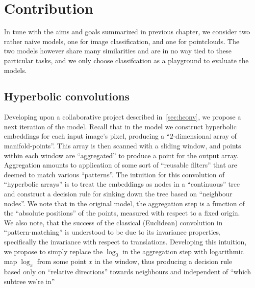 \chapter{Contribution} \label{chap:conclusion}

In tune with the aims and goals summarized in previous chapter,
we consider two rather naive models, one for image classification, and one for
pointclouds. The two models however share many similarities and are in no way
tied to these particular tasks, and we only choose classifcation as a
playground to evaluate the models.

\section{Hyperbolic convolutions} \label{sec:hconv-new}

Developing upon a collaborative project described
in~\autoref{sec:hconv}, we propose a next
iteration of the model. Recall that in the model we construct hyperbolic
embeddings for each input image's pixel, producing a ``\( 2 \)-dimensional
array of manifold-points''. This array is then scanned with a sliding window,
and points within each window are ``aggregated'' to produce a point for the
output array. Aggregation amounts to application of some sort of ``reusable
filters'' that are deemed to match various ``patterns''. The intuition for this convolution
of ``hyperbolic arrays'' is to treat the embeddings as nodes in a ``continuous'' tree
and construct a decision rule for sinking down the tree based on ``neighbour nodes''.
We note that in the original model, the aggregation step is a function of the
``absolute positions'' of the points, measured with respect to a fixed origin.
We also note, that the success of the classical (Euclidean) convolution in
``pattern-matching'' is understood to be due to its invariance properties,
specifically the invariance with respect to translations. Developing this intuition,
we propose to simply replace the \( \log_0 \) in the aggregation step
with logarithmic map \( \log_x \) from some point \( x \) in the window, thus
producing a decision rule based only on ``relative directions'' towards neighbours
and independent of ``which subtree we're in''

